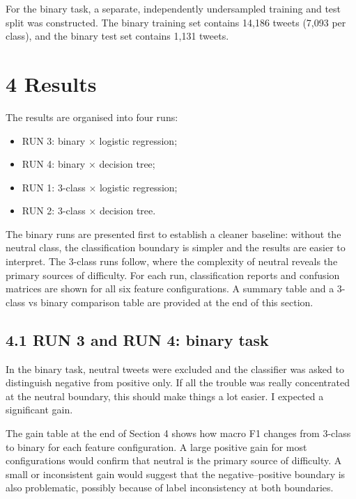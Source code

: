 \documentclass[12pt]{article}
\begin{document}
For the binary task, a separate, independently undersampled training and test split was constructed. The binary training set contains 14,186 tweets (7,093 per class), and the binary test set contains 1,131 tweets.



\section*{4 Results}



The results are organised into four runs:

\begin{itemize}

  \item RUN 3: binary $\times$ logistic regression;

  \item RUN 4: binary $\times$ decision tree;

  \item RUN 1: 3-class $\times$ logistic regression;

  \item RUN 2: 3-class $\times$ decision tree.

\end{itemize} The binary runs are presented first to establish a cleaner baseline: without the neutral class, the classification boundary is simpler and the results are easier to interpret. The 3-class runs follow, where the complexity of neutral reveals the primary sources of difficulty. For each run, classification reports and confusion matrices are shown for all six feature configurations. A summary table and a 3-class vs binary comparison table are provided at the end of this section.



\subsection*{4.1 RUN 3 and RUN 4: binary task}



In the binary task, neutral tweets were excluded and the classifier was asked to distinguish negative from positive only. If all the trouble was really concentrated at the neutral boundary, this should make things a lot easier. I expected a significant gain.

The gain table at the end of Section 4 shows how macro F1 changes from 3-class to binary for each feature configuration. A large positive gain for most configurations would confirm that neutral is the primary source of difficulty. A small or inconsistent gain would suggest that the negative--positive boundary is also problematic, possibly because of label inconsistency at both boundaries.
\end{document}
